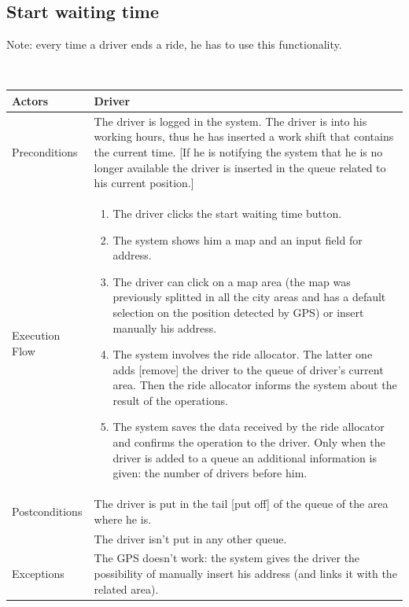 \subsection{Start waiting time}
\begin{footnotesize}
	Note: every time a driver ends a ride, he has to use this functionality.
\end{footnotesize}\\
\begin{tabular}{lp{8cm}}
	\hline 
	Actors & Driver  \\ \hline
	Preconditions & The driver is logged in the system. The driver is into his working hours, thus he has inserted a work shift that contains the current time. [If he is notifying the system that he is no longer available the driver is inserted in the queue related to his current position.] \\ \hline
	Execution Flow &  \begin{enumerate}
					\item The driver clicks the start waiting time button.
					\item The system shows him a map and an input field for address.
					\item The driver can click on a map area (the map was previously splitted in all the city areas and has a default selection on the position detected by GPS) or insert manually his address.
					\item The system involves the ride allocator. The latter one adds [remove] the driver to the queue of driver's current area. Then the ride allocator informs the system about the result of the operations.
					\item The system saves the data received by the ride allocator and confirms the operation to the driver. Only when the driver is added to a queue an additional information is given: the number of drivers before him.
				\end{enumerate}
	 \\ \hline
	 Postconditions & The driver is put in the tail [put off] of the queue of the area where he is.\\
	 				& The driver isn't put in any other queue. \\ \hline
	 Exceptions &  The GPS doesn't work: the system gives the driver the possibility of manually insert his address (and links it with the related area). \\ \hline
\end{tabular}

